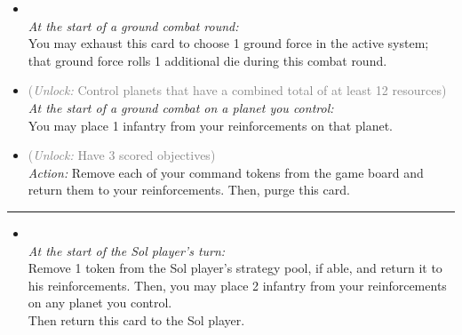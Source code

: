 \begin{multicols}{2}

\begin{itemize}
\item {}\\
\emph{At the start of a ground combat round:}\\
You may exhaust this card to choose 1 ground force in the active system; that ground force rolls 1 additional die during this combat round.
\item {} \textcolor{gray}{(\emph{Unlock:} Control planets that have a combined total of at least 12 resources)}
\emph{At the start of a ground combat on a planet you control:}\\
You may place 1 infantry from your reinforcements on that planet.
\item {} \textcolor{gray}{(\emph{Unlock:} Have 3 scored objectives)}\\
\emph{Action:} Remove each of your command tokens from the game board and return them to your reinforcements. Then, purge this card.
\end{itemize}

\vspace{-10pt}\rule{\hsize}{0.4pt}\vspace{5pt}


\begin{itemize}
\item {}\\
\emph{At the start of the Sol player's turn:}\\
Remove 1 token from the Sol player's strategy pool, if able, and return it to his reinforcements. Then, you may place 2 infantry from your reinforcements on any planet you control.\\
Then return this card to the Sol player.
\end{itemize}

\end{multicols}



